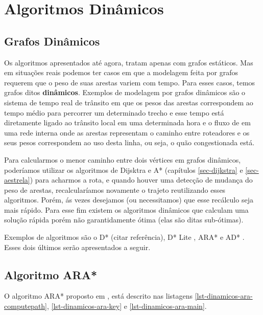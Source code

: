\chapter{Algoritmos Dinâmicos}
\label{sec-dinamicos}

\section{Grafos Dinâmicos}
\label{sec-dinamicos-grafos}
Os algoritmos apresentados até agora, tratam apenas com grafos estáticos. Mas em situações reais podemos ter casos em que a modelagem feita por grafos requerem que o peso de suas arestas variem com tempo. Para esses casos, temos grafos ditos \textbf{dinâmicos}. Exemplos de modelagem por grafos dinâmicos são o sistema de tempo real de trânsito em que os pesos das arestas correspondem ao tempo médio para percorrer um determinado trecho e esse tempo está diretamente ligado ao trânsito local em uma determinada hora e o fluxo de em uma rede interna onde as arestas representam o caminho entre roteadores e os seus pesos correspondem ao uso desta linha, ou seja, o quão congestionada está.

Para calcularmos o menor caminho entre dois vértices em grafos dinâmicos, poderíamos utilizar os algoritmos de Dijsktra e A* (capítulos \ref{sec-dijkstra} e \ref{sec-aestrela})  para acharmos a rota, e quando houver uma detecção de mudança do peso de arestas, recalcularíamos novamente o trajeto reutilizando esses algoritmos. Porém, ás vezes desejamos (ou necessitamos) que esse recálculo seja mais rápido. Para esse fim existem os algoritmos dinâmicos que calculam uma solução rápida porém não garantidamente ótima (elas são ditas sub-ótimas).

Exemplos de algoritmos são o D* (citar referência), D* Lite \cite{koenig2002d}, ARA* e AD* \cite{likhachev2008anytime}. Esses dois últimos serão apresentados a seguir.
\section{Algoritmo ARA*}
\label{sec-dinamicos-ara}

O algoritmo ARA* proposto em , está descrito nas listagens \ref{lst-dinamicos-ara-computepath}, \ref{lst-dinamicos-ara-key} e \ref{lst-dinamicos-ara-main}.

